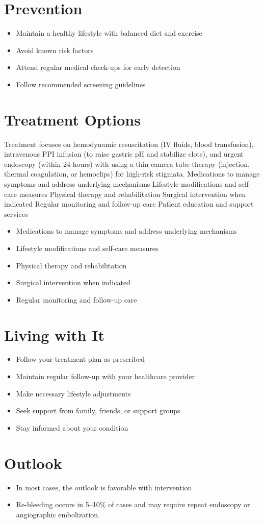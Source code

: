 \section{Prevention}
\begin{itemize}[noitemsep]
  \item Maintain a healthy lifestyle with balanced diet and exercise
  \item Avoid known risk factors
  \item Attend regular medical check-ups for early detection
  \item Follow recommended screening guidelines
\end{itemize}
\section{Treatment Options}
Treatment focuses on hemodynamic resuscitation (IV fluids, blood transfusion), intravenous PPI infusion (to raise gastric pH and stabilize clots), and urgent endoscopy (within 24 hours) with using a thin camera tube therapy (injection, thermal coagulation, or hemoclips) for high-risk stigmata. Medications to manage symptoms and address underlying mechanisms Lifestyle modifications and self-care measures Physical therapy and rehabilitation Surgical intervention when indicated Regular monitoring and follow-up care Patient education and support services

\begin{itemize}[noitemsep]
  \item Medications to manage symptoms and address underlying mechanisms
  \item Lifestyle modifications and self-care measures
  \item Physical therapy and rehabilitation
  \item Surgical intervention when indicated
  \item Regular monitoring and follow-up care
\end{itemize}
\section{Living with It}
\begin{itemize}[noitemsep]
  \item Follow your treatment plan as prescribed
  \item Maintain regular follow-up with your healthcare provider
  \item Make necessary lifestyle adjustments
  \item Seek support from family, friends, or support groups
  \item Stay informed about your condition
\end{itemize}
\section{Outlook}
\begin{itemize}[noitemsep]
  \item In most cases, the outlook is favorable with intervention
  \item Re-bleeding occurs in 5--10\% of cases and may require repeat endoscopy or angiographic embolization.
\end{itemize}

